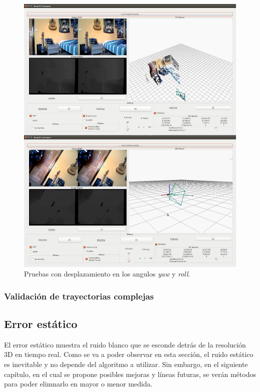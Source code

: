 \begin{figure}[th]
\centering
\includegraphics[scale=0.3]{Figures/tests/yaw-roll.png}
\decoRule
\caption[Pruebas con desplazamiento en los angulos \textit{yaw} y \textit{roll}]{Pruebas con desplazamiento en los angulos \textit{yaw} y \textit{roll}.}
\label{fig:yaw-roll}
\end{figure}

\subsubsection{Validación de trayectorias complejas}

\subsection{Error estático}

El error estático muestra el ruido blanco que se esconde detrás de la resolución 3D en tiempo real. Como se va a poder observar en esta sección, el ruido estático es inevitable y no depende del algoritmo a utilizar. Sin embargo, en el siguiente capítulo, en el cual se propone posibles mejoras y líneas futuras, se verán métodos para poder elimnarlo en mayor o menor medida.

